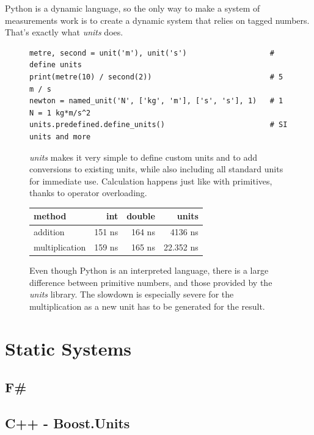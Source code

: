 \documentclass[12pt,oneside,a4paper]{scrbook}
\theoremstyle{definition}
\begin{document}
Python is a dynamic language, so the only way to make a system of measurements work is to create a dynamic system that relies on tagged numbers. That's exactly what \emph{units} \citep{Donohue12} does.

\begin{figure}
\begin{verbatim}
metre, second = unit('m'), unit('s')                   # define units
print(metre(10) / second(2))                           # 5 m / s
newton = named_unit('N', ['kg', 'm'], ['s', 's'], 1)   # 1 N = 1 kg*m/s^2
units.predefined.define_units()                        # SI units and more
\end{verbatim}
\caption{\emph{units} makes it very simple to define custom units and to add conversions to existing units, while also including all standard units for immediate use. Calculation happens just like with primitives, thanks to operator overloading.}
\label{code:python_units}
\end{figure}



\begin{figure}
\begin{tabular}{lrrr}
method          & int    & double  & units \\
\midrule
addition        & 151 ns &  164 ns    &   4136 ns \\
multiplication  & 159 ns &  165 ns    &   22.352 ns
\end{tabular}
\caption{Even though Python is an interpreted language, there is a large difference between primitive numbers, and those provided by the \emph{units} library. The slowdown is especially severe for the multiplication as a new unit has to be generated for the result.}
\label{bench:python_units}
\end{figure}


\section{Static Systems}

\subsection{F\#}
\citep{Kennedy08:1}
\citep{Kennedy08:2}
\citep{Kennedy08:3}
\citep{Kennedy08:4}

\subsection{C++ - Boost.Units}
\citep{Schabel10}
\end{document}
